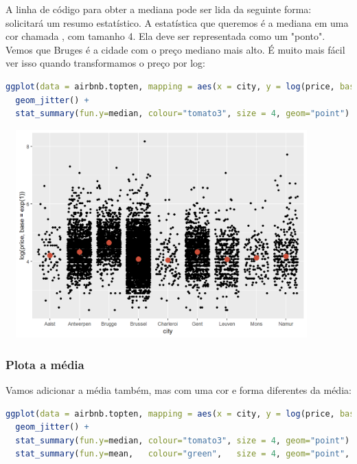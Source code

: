 \documentclass{article}
\begin{document}
A linha de código para obter a mediana pode ser lida da seguinte forma:  solicitará um resumo estatístico. A estatística que queremos é a mediana em uma cor chamada , com tamanho 4. Ela deve ser representada como um "ponto". Vemos que Bruges é a cidade com o preço mediano mais alto. É muito mais fácil ver isso quando transformamos o preço por log:

\begin{lstlisting}[language=R]
ggplot(data = airbnb.topten, mapping = aes(x = city, y = log(price, base = exp(1)))) + 
  geom_jitter() +
  stat_summary(fun.y=median, colour="tomato3", size = 4, geom="point")
\end{lstlisting}


\begin{center}
\includegraphics[width=12cm,height=8cm]{intro_plot_log_mean-1.png}
\end{center}

\subsubsection{Plota a média}

Vamos adicionar a média também, mas com uma cor e forma diferentes da média:

\begin{lstlisting}[language=R]
ggplot(data = airbnb.topten, mapping = aes(x = city, y = log(price, base = exp(1)))) + 
  geom_jitter() +
  stat_summary(fun.y=median, colour="tomato3", size = 4, geom="point") +
  stat_summary(fun.y=mean,   colour="green",   size = 4, geom="point", shape = 23, fill = "green")
\end{lstlisting}
\end{document}
